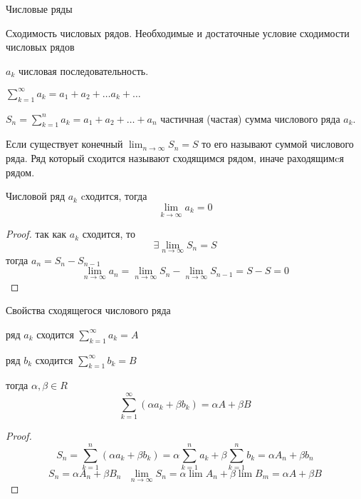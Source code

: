\begin{title}
  Числовые ряды
\end{title}

\begin{title}[\Large]
  Сходимость числовых рядов. Необходимые и достаточные условие сходимости
  числовых рядов
\end{title}

  $a_k$ числовая последовательность.

  $\sum_{k=1}^{\infty} a_k = a_1 + a_2 + \ldots a_k + \ldots$

  $S_n = \sum_{k=1}^n a_k = a_1 + a_2 + \ldots + a_n$ частичная (частая)
сумма числового ряда $a_k$.

  Если существует конечный $\lim_{n \to \infty} S_n = S$ то его называют суммой
числового ряда. Ряд который сходится называют сходящимся рядом, иначе
раходящимcя рядом.

\begin{block}
  Числовой ряд $a_k$ cходится, тогда
  $$
  \lim_{k \to \infty} a_k = 0
  $$
\end{block}

\begin{proof}
  так как $a_k$ сходится, то
  $$
  \exists \lim_{n \to \infty} S_n = S  $$
  тогда $a_n = S_n - S_{n-1}$
  $$
  \lim_{n \to \infty} a_n = \lim_{n \to \infty} S_n -
  \lim_{n \to \infty} S_{n-1} = S - S = 0
  $$
\end{proof}

\begin{title}[\Large]
  Свойства сходящегося числового ряда
\end{title}

\begin{theorem}
  ряд $a_k$ сходится $\sum_{k=1}^{\infty} a_k = A$

  ряд $b_k$ сходится $\sum_{k=1}^{\infty} b_k = B$

  тогда $\alpha, \beta \in R$
  $$
  \sum_{k=1}^{\infty} (\alpha a_k + \beta b_k) = \alpha A + \beta B
  $$
\end{theorem}

\begin{proof}
  $$
  S_n = \sum_{k=1}^n (\alpha a_k + \beta b_k) =
  \alpha \sum_{k=1}^n a_k + \beta \sum_{k=1}^n b_k = \alpha A_n + \beta b_n
  $$
  $$
  S_n = \alpha A_n + \beta B_n ~~~
  \lim_{n \to \infty} S_n = \alpha \lim A_n + \beta \lim B_m =
  \alpha A + \beta B
  $$
\end{proof}

